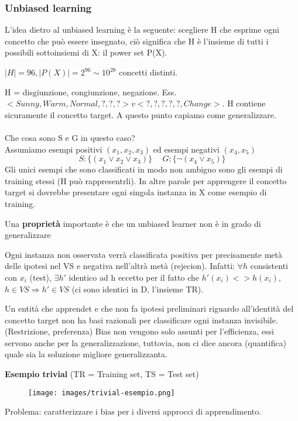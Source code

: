 \subsubsection{Unbiased learning}
L'idea dietro al unbiased learning è la seguente: scegliere H che esprime ogni concetto che può
essere insegnato, ciò significa che H è l'insieme di tutti i possibili sottoinsiemi di X: il power set P(X).
\begin{example}
    $|H| = 96, |P(X)| = 2^{96} \sim 10^{28}$ concetti distinti.
\end{example}
\hspace{-15pt}H = disgiunzione, congiunzione, negazione. Ess. $<Sunny, Warm, Normal, ?, ?, ?> v <?, ?, ?, ?, ?, Change>$.
H contiene sicuramente il concetto target. A questo punto capiamo come generalizzare.\\\\
Che cosa sono S e G in questo caso?\\
Assumiamo esempi positivi $(x_1, x_2, x_3)$ ed esempi negativi $(x_4, x_5)$
$$S: \{(x_1 \lor x_2 \lor x_3)\} \hspace{15pt} G: \{\lnot (x_4 \lor x_5)\}$$
Gli unici esempi che sono classificati in modo non ambiguo sono gli esempi di training stessi (H può rappresentrli). In altre parole
per apprengere il concetto target si dovrebbe presentare ogni singola instanza in X come esempio di training.
\begin{proposition}
    Una \textbf{proprietà} importante è che un unbiased learner non è in grado di generalizzare
\end{proposition}
\begin{demostration}
    Ogni instanza non osservata verrà classificata positiva per precisamente metà delle ipotesi nel VS e negativa nell'altrà metà (rejecion).
    Infatti: $\forall h$ consistenti con $x_i$ (test), $\exists h'$ identico ad h eccetto per il fatto che $h'(x_i) <> h(x_i)$, $h\in VS \Rightarrow h' \in VS$ (ci sono identici in D, l'insieme TR).
\end{demostration}
\hspace{-15pt}Un entità che apprendet e che non fa ipotesi preliminari riguardo all'identità del concetto target non ha basi
razionali per classificare ogni instanza invisibile. (Restrizione, preferenza) Bias non vengono solo assunti per l'efficienza, 
essi servono anche per la generalizzazione, tuttovia, non ci dice ancora (quantifica) quale sia la soluzione migliore generalizzanta.
\begin{example}
    \textbf{Esempio trivial} (TR = Training set, TS = Test set)
    \begin{figure}[h!]
        \centering
        \texttt{[image: images/trivial-esempio.png]}
    \end{figure}
\end{example}
\hspace{-15pt}Problema: caratterizzare i bias per i diversi approcci di apprendimento.
